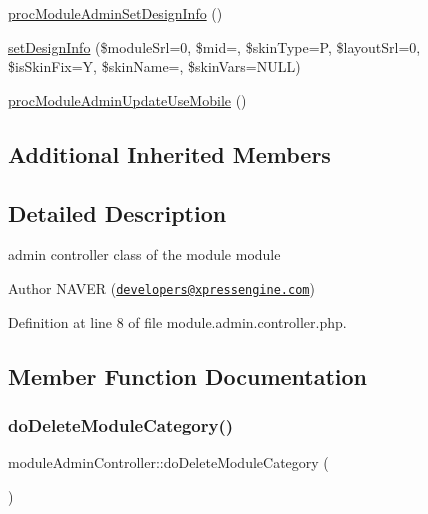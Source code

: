 \begin{DoxyCompactItemize}
\hyperlink{classmoduleAdminController_ae54d4745ef9b34c46bb3c8943314ee8d}{proc\+Module\+Admin\+Set\+Design\+Info} ()
\item 
\hyperlink{classmoduleAdminController_a1ff90fe08fe1f3d67783ff81b91ee3b2}{set\+Design\+Info} (\$module\+Srl=0, \$mid=\textquotesingle{}\textquotesingle{}, \$skin\+Type=\textquotesingle{}P\textquotesingle{}, \$layout\+Srl=0, \$is\+Skin\+Fix=\textquotesingle{}Y\textquotesingle{}, \$skin\+Name=\textquotesingle{}\textquotesingle{}, \$skin\+Vars=N\+U\+LL)
\item 
\hyperlink{classmoduleAdminController_a70143beac165b7795868db95f0d4b4e6}{proc\+Module\+Admin\+Update\+Use\+Mobile} ()
\end{DoxyCompactItemize}
\subsection*{Additional Inherited Members}


\subsection{Detailed Description}
admin controller class of the module module 

\begin{DoxyAuthor}{Author}
N\+A\+V\+ER (\href{mailto:developers@xpressengine.com}{\tt developers@xpressengine.\+com}) 
\end{DoxyAuthor}


Definition at line 8 of file module.\+admin.\+controller.\+php.



\subsection{Member Function Documentation}
\hypertarget{classmoduleAdminController_a80e37ec16dc036325888cb3890b51575}{}\label{classmoduleAdminController_a80e37ec16dc036325888cb3890b51575} 
\subsubsection{\texorpdfstring{do\+Delete\+Module\+Category()}{doDeleteModuleCategory()}}
{\footnotesize\ttfamily module\+Admin\+Controller\+::do\+Delete\+Module\+Category (\begin{DoxyParamCaption}{ }\end{DoxyParamCaption})}



